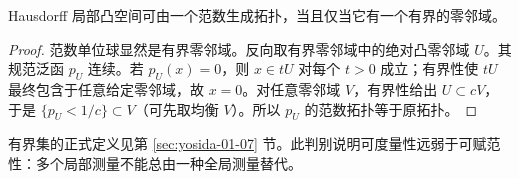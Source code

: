 \begin{proposition}[补充：可赋范性的判别]\label{prop:y1-normable}
Hausdorff 局部凸空间可由一个范数生成拓扑，当且仅当它有一个有界的零邻域。
\end{proposition}
\begin{proof}
范数单位球显然是有界零邻域。反向取有界零邻域中的绝对凸零邻域 $U$。其规范泛函 $p_U$ 连续。若 $p_U(x)=0$，则 $x\in tU$ 对每个 $t>0$ 成立；有界性使 $tU$ 最终包含于任意给定零邻域，故 $x=0$。对任意零邻域 $V$，有界性给出 $U\subset cV$，于是 $\{p_U<1/c\}\subset V$（可先取均衡 $V$）。所以 $p_U$ 的范数拓扑等于原拓扑。
\end{proof}
有界集的正式定义见第 \ref{sec:yosida-01-07} 节。此判别说明可度量性远弱于可赋范性：多个局部测量不能总由一种全局测量替代。
